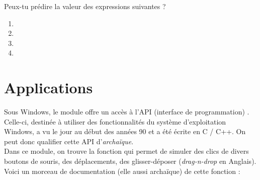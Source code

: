 \documentclass[a4paper,12pt,french]{book}
\begin{document}
\begin{exercice}
	Peux-tu prédire la valeur des expressions suivantes ?
	\begin{enumerate}[\bfseries 1.]
		\item 	{}
		\item 	{}
		\item 	{}
		\item 	{}
	\end{enumerate}
\end{exercice}

\section{Applications}

Sous Windows, le module  offre un accès à l'API (interface de programmation) . Celle-ci, destinée à utiliser des fonctionnalités du système d'exploitation Windows, a vu le jour au début des années 90 et a été écrite en \textsc{C} / \textsc{C++}. On peut donc qualifier cette API d'\textit{archaïque}.\\
Dans ce module, on trouve la fonction  qui permet de simuler des clics de divers boutons de souris, des déplacements, des glisser-déposer (\textit{drag-n-drop} en Anglais).\\
Voici un morceau de documentation (elle aussi archaïque) de cette fonction :\\
\end{document}
